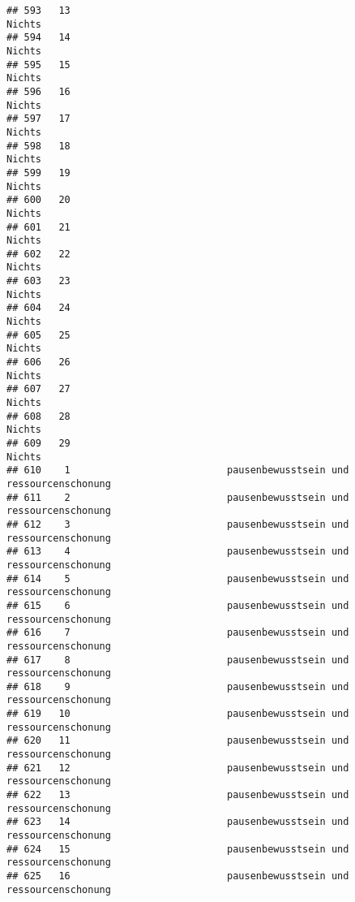\documentclass[
]{article}
\begin{document}
\begin{verbatim}
## 593   13                                                              Nichts
## 594   14                                                              Nichts
## 595   15                                                              Nichts
## 596   16                                                              Nichts
## 597   17                                                              Nichts
## 598   18                                                              Nichts
## 599   19                                                              Nichts
## 600   20                                                              Nichts
## 601   21                                                              Nichts
## 602   22                                                              Nichts
## 603   23                                                              Nichts
## 604   24                                                              Nichts
## 605   25                                                              Nichts
## 606   26                                                              Nichts
## 607   27                                                              Nichts
## 608   28                                                              Nichts
## 609   29                                                              Nichts
## 610    1                           pausenbewusstsein und ressourcenschonung 
## 611    2                           pausenbewusstsein und ressourcenschonung 
## 612    3                           pausenbewusstsein und ressourcenschonung 
## 613    4                           pausenbewusstsein und ressourcenschonung 
## 614    5                           pausenbewusstsein und ressourcenschonung 
## 615    6                           pausenbewusstsein und ressourcenschonung 
## 616    7                           pausenbewusstsein und ressourcenschonung 
## 617    8                           pausenbewusstsein und ressourcenschonung 
## 618    9                           pausenbewusstsein und ressourcenschonung 
## 619   10                           pausenbewusstsein und ressourcenschonung 
## 620   11                           pausenbewusstsein und ressourcenschonung 
## 621   12                           pausenbewusstsein und ressourcenschonung 
## 622   13                           pausenbewusstsein und ressourcenschonung 
## 623   14                           pausenbewusstsein und ressourcenschonung 
## 624   15                           pausenbewusstsein und ressourcenschonung 
## 625   16                           pausenbewusstsein und ressourcenschonung 

\end{verbatim}
\end{document}
